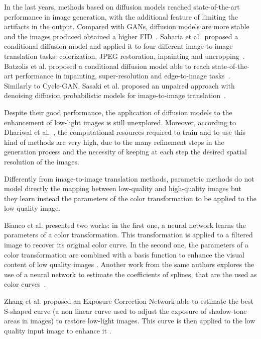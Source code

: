 \documentclass[3p,twocolumn]{elsarticle}
\begin{document}
In the last years, methods based on diffusion models reached state-of-the-art performance in image generation, with the additional feature of limiting the artifacts in the output. Compared with GANs, diffusion models are more stable and the images produced obtained a higher FID~\cite{dhariwal2021diffusion}.
Saharia et al.\ proposed a conditional diffusion model and applied it to four different image-to-image translation tasks: colorization, JPEG restoration, inpainting and uncropping~\cite{saharia2022palette}.
Batzolis et al. proposed a conditional diffusion model able to reach state-of-the-art performance in inpainting, super-resolution and edge-to-image tasks~\cite{batzolis2021conditional}.
Similarly to Cycle-GAN, Sasaki et al. proposed an unpaired approach with denoising diffusion probabilistic models for image-to-image translation~\cite{sasaki2021unit}.

Despite their good performance, the application of diffusion models to the enhancement of low-light images is still unexplored. Moreover, according to Dhariwal et al.~\cite{dhariwal2021diffusion}, the computational resources required to train and to use this kind of methods are very high, due to the many refinement steps in the generation process and the necessity of keeping at each step the desired spatial resolution of the images.


Differently from image-to-image translation methods, parametric methods do not model directly the mapping between low-quality and high-quality images but they learn instead the parameters of the color transformation to be applied to the low-quality image. 

Bianco et al. presented two works: in the first one, a neural network learns the parameters of a color transformation. This transformation is applied to a filtered image to recover its original color curve. In the second one, the parameters of a color transformation are combined with a basis function to enhance the visual content of low quality images \cite{bianco2017artistic,bianco2019learning}. Another work from the same authors explores the use of a neural network to estimate the coefficients of splines, that are the used as color curves~\cite{bianco2020personalized}. 

Zhang et al. proposed an Exposure Correction Network able to estimate the best S-shaped curve (a non linear curve used to adjust the exposure of shadow-tone areas in images) to restore low-light images. This curve is then applied to the low quality input image to enhance it \cite{zhang2019zero}.
\end{document}
